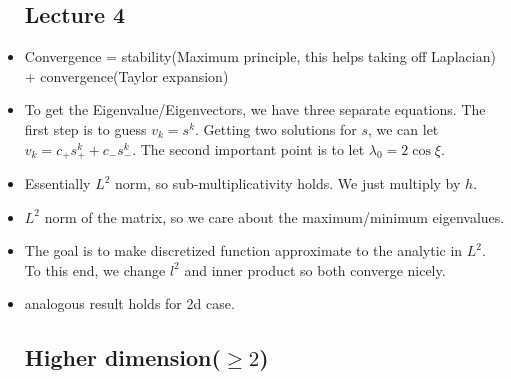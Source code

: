 \documentclass{article}
\theoremstyle{remark}
\begin{document}
\begin{itemize}
\subsection*{Lecture 4}
    \item Convergence = stability(Maximum principle, this helps taking off Laplacian) + convergence(Taylor expansion)
    \item To get the Eigenvalue/Eigenvectors, we have three separate equations. The first step is to guess $v_k=s^k$. Getting two solutions for $s$, we can let $v_k=c_+ s^k_+ +c_- s^k_-$. The second important point is to let $\lambda_0=2\cos \xi$.
    \item Essentially $L^2$ norm, so sub-multiplicativity holds. We just multiply by $h$.
    \item $L^2$ norm of the matrix, so we care about the maximum/minimum eigenvalues.
    \item The goal is to make discretized function approximate to the analytic in $L^2$. To this end, we change $l^2$ and inner product so both converge nicely.
    \item analogous result holds for 2d case. 

\subsection*{Higher dimension($\geq 2$)}


    
\end{itemize}
\end{document}
